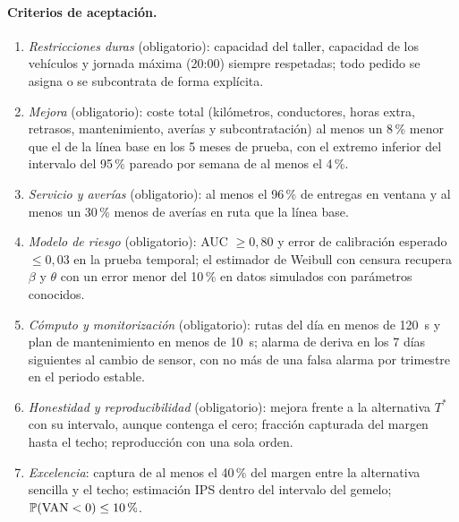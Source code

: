 \paragraph{Criterios de aceptación.}
\begin{enumerate}[label=C\arabic*.]
  \item \emph{Restricciones duras} (obligatorio): capacidad del taller, capacidad de los vehículos y jornada máxima (20:00) siempre respetadas; todo pedido se asigna o se subcontrata de forma explícita.
  \item \emph{Mejora} (obligatorio): coste total (kilómetros, conductores, horas extra, retrasos, mantenimiento, averías y subcontratación) al menos un 8\,\% menor que el de la línea base en los 5 meses de prueba, con el extremo inferior del intervalo del 95\,\% pareado por semana de al menos el 4\,\%.
  \item \emph{Servicio y averías} (obligatorio): al menos el 96\,\% de entregas en ventana y al menos un 30\,\% menos de averías en ruta que la línea base.
  \item \emph{Modelo de riesgo} (obligatorio): AUC $\ge 0{,}80$ y error de calibración esperado $\le 0{,}03$ en la prueba temporal; el estimador de Weibull con censura recupera $\beta$ y $\theta$ con un error menor del 10\,\% en datos simulados con parámetros conocidos.
  \item \emph{Cómputo y monitorización} (obligatorio): rutas del día en menos de 120~s y plan de mantenimiento en menos de 10~s; alarma de deriva en los 7 días siguientes al cambio de sensor, con no más de una falsa alarma por trimestre en el periodo estable.
  \item \emph{Honestidad y reproducibilidad} (obligatorio): mejora frente a la alternativa $T^{\ast}$ con su intervalo, aunque contenga el cero; fracción capturada del margen hasta el techo; reproducción con una sola orden.
  \item \emph{Excelencia}: captura de al menos el 40\,\% del margen entre la alternativa sencilla y el techo; estimación IPS dentro del intervalo del gemelo; $\mathbb{P}(\mathrm{VAN}<0)\le 10\,\%$.
\end{enumerate}

